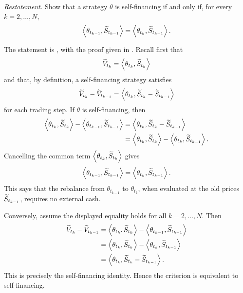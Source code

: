 \begin{exercise}
\emph{Restatement.}  Show that a strategy \(\theta\) is self-financing if
and only if, for every \(k=2,\ldots,N\),
\[
  \left\langle \theta_{t_{k-1}},\widetilde S_{t_{k-1}}\right\rangle
  =
  \left\langle \theta_{t_k},\widetilde S_{t_{k-1}}\right\rangle.
\]
\end{exercise}

\begin{solution}
The statement is , with the proof given in
.  Recall first that
\[
  \widetilde V_{t_k}=\left\langle \theta_{t_k},\widetilde S_{t_k}\right\rangle
\]
and that, by definition, a self-financing strategy satisfies
\[
  \widetilde V_{t_k}-\widetilde V_{t_{k-1}}
    =\left\langle \theta_{t_k},\widetilde S_{t_k}-\widetilde S_{t_{k-1}}\right\rangle
\]
for each trading step.  If \(\theta\) is self-financing, then
\[
\begin{aligned}
  \left\langle \theta_{t_k},\widetilde S_{t_k}\right\rangle
  -\left\langle \theta_{t_{k-1}},\widetilde S_{t_{k-1}}\right\rangle
    &=
  \left\langle \theta_{t_k},\widetilde S_{t_k}-\widetilde S_{t_{k-1}}\right\rangle  \\
    &=
  \left\langle \theta_{t_k},\widetilde S_{t_k}\right\rangle
  -\left\langle \theta_{t_k},\widetilde S_{t_{k-1}}\right\rangle.
\end{aligned}
\]
Cancelling the common term
\(\left\langle \theta_{t_k},\widetilde S_{t_k}\right\rangle\) gives
\[
  \left\langle \theta_{t_{k-1}},\widetilde S_{t_{k-1}}\right\rangle
  =
  \left\langle \theta_{t_k},\widetilde S_{t_{k-1}}\right\rangle.
\]
This says that the rebalance from \(\theta_{t_{k-1}}\) to
\(\theta_{t_k}\), when evaluated at the old prices \(\widetilde S_{t_{k-1}}\),
requires no external cash.

Conversely, assume the displayed equality holds for all \(k=2,\ldots,N\).
Then
\[
\begin{aligned}
  \widetilde V_{t_k}-\widetilde V_{t_{k-1}}
    &=
  \left\langle \theta_{t_k},\widetilde S_{t_k}\right\rangle
  -\left\langle \theta_{t_{k-1}},\widetilde S_{t_{k-1}}\right\rangle \\
    &=
  \left\langle \theta_{t_k},\widetilde S_{t_k}\right\rangle
  -\left\langle \theta_{t_k},\widetilde S_{t_{k-1}}\right\rangle \\
    &=
  \left\langle \theta_{t_k},\widetilde S_{t_k}-\widetilde S_{t_{k-1}}\right\rangle.
\end{aligned}
\]
This is precisely the self-financing identity.  Hence the criterion is
equivalent to self-financing.
\end{solution}
